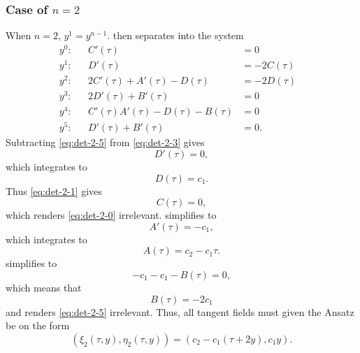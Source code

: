 \subsubsection{Case of \texorpdfstring{\(n=2\)}{n is 2}}

When \(n=2\), \(y^1 = y^{n-1}\).
 then separates into the system
\begin{subequations}
  \begin{flalign}
      y^0:  && C'(\tau) &= 0                               &\label{eq:det-2-0}\\
      y^1:  && D'(\tau) &= -2C(\tau)                       &\label{eq:det-2-1}\\
      y^2:  && 2C'(\tau) + A'(\tau) - D(\tau) &= -2D(\tau) &\label{eq:det-2-2}\\
      y^3:  && 2D'(\tau) + B'(\tau) &= 0                   &\label{eq:det-2-3}\\
      y^4:  && C'(\tau) A'(\tau) - D(\tau) - B(\tau) &= 0  &\label{eq:det-2-4}\\
      y^5:  && D'(\tau) + B'(\tau) &= 0.                   &\label{eq:det-2-5}
  \end{flalign}
\end{subequations}
Subtracting \cref{eq:det-2-5} from \cref{eq:det-2-3} gives
\begin{equation*}
  D'(\tau) = 0,
\end{equation*}
which integrates to
\begin{equation*}
  D(\tau) = c_1.
\end{equation*}
Thus \cref{eq:det-2-1} gives
\begin{equation*}
  C(\tau) = 0,
\end{equation*}
which renders \cref{eq:det-2-0} irrelevant.
 simplifies to
\begin{equation*}
  A'(\tau) = - c_1,
\end{equation*}
which integrates to
\begin{equation*}
  A(\tau) = c_2 - c_1 \tau.
\end{equation*}
 simplifies to
\begin{equation*}
  - c_1 - c_1 - B(\tau) = 0,
\end{equation*}
which means that
\begin{equation*}
  B(\tau) = -2 c_1
\end{equation*}
and renders \cref{eq:det-2-5} irrelevant.
Thus, all tangent fields must given the Ansatz be on the form
\begin{equation} \label{eq:hill-tangent-field-2}
  \left(\xi_2(\tau,y),\eta_2(\tau,y)\right) = 
  \left(c_2 - c_1 \left( \tau + 2 y \right), c_1 y\right).
\end{equation}

